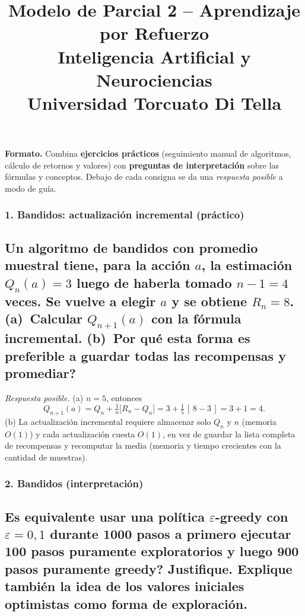 \documentclass[11pt, a4paper]{article}
\title{\textbf{Modelo de Parcial 2 -- Aprendizaje por Refuerzo} \\
\large Inteligencia Artificial y Neurociencias \\ Universidad Torcuato Di Tella}
\author{}
\date{}
\newcommand{\pregunta}[1]{\subsection{#1}}
\newcommand{\eje}[1]{\subsubsection{#1}}
\begin{document}
\maketitle

\begin{mdframed}[linecolor=black, linewidth=0.7pt]
\textbf{Formato.} Combina \textbf{ejercicios pr\'acticos} (seguimiento manual de algoritmos, c\'alculo de retornos y valores) con \textbf{preguntas de interpretaci\'on} sobre las f\'ormulas y conceptos. Debajo de cada consigna se da una \emph{respuesta posible} a modo de gu\'ia.
\end{mdframed}

\eje{1. Bandidos: actualizaci\'on incremental (pr\'actico)}
\pregunta{Un algoritmo de bandidos con promedio muestral tiene, para la acci\'on $a$, la estimaci\'on $Q_n(a)=3$ luego de haberla tomado $n-1=4$ veces. Se vuelve a elegir $a$ y se obtiene $R_n = 8$. (a)~Calcular $Q_{n+1}(a)$ con la f\'ormula incremental. (b)~\textquestiondown Por qu\'e esta forma es preferible a guardar todas las recompensas y promediar?}

\begin{respuesta}
\textit{Respuesta posible.} (a) $n=5$, entonces
\[
Q_{n+1}(a) = Q_n + \tfrac{1}{n}\big[R_n - Q_n\big] = 3 + \tfrac{1}{5}\,[\,8-3\,] = 3 + 1 = 4.
\]
(b) La actualizaci\'on incremental requiere almacenar solo $Q_n$ y $n$ (memoria $O(1)$) y cada actualizaci\'on cuesta $O(1)$, en vez de guardar la lista completa de recompensas y recomputar la media (memoria y tiempo crecientes con la cantidad de muestras).
\end{respuesta}

\eje{2. Bandidos (interpretaci\'on)}
\pregunta{\textquestiondown Es equivalente usar una pol\'itica $\varepsilon$-greedy con $\varepsilon=0{,}1$ durante 1000 pasos a primero ejecutar 100 pasos puramente exploratorios y luego 900 pasos puramente greedy? Justifique. Explique tambi\'en la idea de los \textbf{valores iniciales optimistas} como forma de exploraci\'on.}
\end{document}
